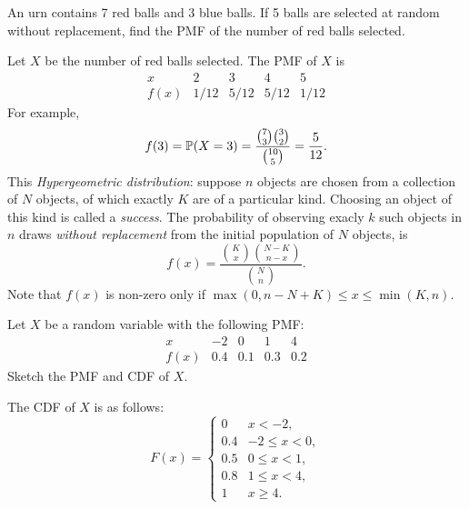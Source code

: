 \begin{exercise}
\begin{questions}


\question
An urn contains 7 red balls and 3 blue balls. If 5 balls are selected at random without replacement, find the PMF of the number of red balls selected.
\begin{answer}
Let $X$ be the number of red balls selected. The PMF of $X$ is
\[
\begin{array}{c|cccc}
x		& 2 		& 3 		& 4 		& 5 \\ \hline
f(x)	& 1/12	& 5/12 	& 5/12 	& 1/12 
\end{array}
\]
For example, 
\[
f(3) = \mathbb{P}(X=3) = \frac{\binom{7}{3}\binom{3}{2}}{\binom{10}{5}} = \frac{5}{12}.
\]
This \emph{Hypergeometric distribution}: suppose $n$ objects are chosen from a collection of $N$ objects, of which exactly $K$ are of a particular kind. Choosing an object of this kind is called a \emph{success}. The probability of observing exacly $k$ such objects in $n$ draws \emph{without replacement} from the initial population of $N$ objects, is
\[
f(x) = \frac{\binom{K}{x}\binom{N-K}{n-x}}{\binom{N}{n}}.
\]
Note that $f(x)$ is non-zero only if $\max(0,n-N+K)\leq x\leq \min(K,n)$.
\end{answer}


\question
Let $X$ be a random variable with the following PMF:
\[\begin{array}{c|cccc}
x		& -2 	& 0 		& 1 		& 4 \\ \hline
f(x)	& 0.4	& 0.1 	& 0.3 	& 0.2 
\end{array}\]
Sketch the PMF and CDF of $X$.
\begin{answer}
The CDF of $X$ is as follows:
\[
F(x) = \left\{\begin{array}{ll}
0  	&  x < -2, \\
0.4	& -2 \leq x < 0, \\
0.5	&  0 \leq x < 1, \\
0.8	&  1 \leq x < 4, \\
1	&  x \geq 4.
\end{array}\right.
\]
\end{answer}



\end{questions}
\end{exercise}
